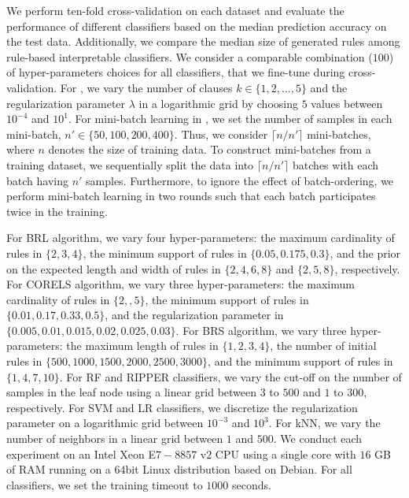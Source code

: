 We perform ten-fold cross-validation on each dataset and evaluate the performance of different classifiers based on the median prediction accuracy on the test data. Additionally, we compare the median size of generated rules among rule-based interpretable classifiers. We consider a comparable combination ($ 100 $) of  hyper-parameters choices for all classifiers, that we fine-tune during cross-validation. For {\imli}, we vary the number of clauses $ k \in \{1, 2, \dots, 5\} $ and the regularization parameter $ \lambda $  in a logarithmic grid by choosing $ 5 $ values between $ 10^{-4} $ and $ 10^1 $. For mini-batch learning in {\imli}, we set the number of samples in each mini-batch, $ n' \in \{50, 100, 200, 400\} $. Thus, we consider $ \lceil n / n' \rceil $ mini-batches, where $ n $ denotes the size of training data. To construct mini-batches from a training dataset, we sequentially split the data into $ \lceil n / n' \rceil $  batches with each batch having $ n' $ samples. Furthermore, to ignore the effect of batch-ordering, we perform mini-batch learning in two rounds such that each batch participates twice in the training.

For BRL algorithm, we vary four hyper-parameters: the maximum cardinality of rules in $ \{2, 3, 4\} $, the minimum support of rules in $ \{0.05, 0.175, 0.3\} $, and the prior on the expected length and width of rules in $ \{2, 4, 6, 8\} $ and $ \{2, 5, 8\} $, respectively. For CORELS algorithm, we vary three hyper-parameters:  the maximum cardinality of rules in $ \{2,, 5\} $, the minimum support of rules in $ \{0.01, 0.17, 0.33, 0.5  \} $, and the regularization parameter in $ \{0.005, 0.01 , 0.015, 0.02 , 0.025, 0.03\}  $. For BRS algorithm, we vary three hyper-parameters: the maximum length of rules in $ \{1,2,3,4\} $, the number of initial rules in $ \{500, 1000, 1500, 2000, 2500, 3000\} $, and the minimum support of rules in $ \{1, 4,7, 10\} $. For RF and RIPPER classifiers, we vary the cut-off on the number of samples in the leaf node using a linear grid between $ 3 $ to $ 500 $ and $ 1 $ to $ 300 $, respectively. For SVM and LR classifiers, we discretize the regularization parameter on a logarithmic grid between  $ 10^{-3} $ and $ 10^3 $. For kNN, we vary the number of neighbors in a linear grid between $ 1 $ and $ 500 $. We conduct each experiment on an Intel Xeon E$ 7-8857 $ v$ 2 $ CPU using a single core with $ 16 $ GB of RAM running on a 64bit Linux distribution based on Debian. For all classifiers, we set the training timeout to $ 1000 $ seconds. 


